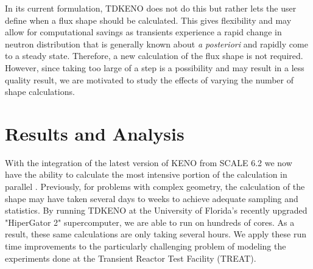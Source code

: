 \documentclass{anstrans}
\renewcommand{\vec}[1]{\bm{#1}} %
\newcommand{\vd}{\bm{\cdot}} %
\newcommand{\grad}{\vec{\nabla}} %
\newcommand{\ud}{\mathop{}\!\mathrm{d}} %
\begin{document}

 In its current formulation, TDKENO does not do this but rather lets the user define when a flux shape should be calculated.  This gives flexibility and may allow for computational savings as transients experience a rapid change in neutron distribution that is generally known about \emph{a posteriori} and rapidly come to a steady state. Therefore, a new calculation of the flux shape is not required. However, since taking too large of a step is a possibility and may result in a less quality result, we are motivated to study the effects of varying the number of shape calculations.


\section{Results and Analysis}
With the integration of the latest version of KENO from SCALE 6.2 we now have the ability to calculate the most intensive portion of the calculation in parallel \cite{rearden2013overview}.  Previously, for problems with complex geometry, the calculation of the shape may have taken several days to weeks to achieve adequate sampling and statistics.  By running TDKENO at the University of Florida's recently upgraded "HiperGator 2" supercomputer, we are able to run on hundreds of cores. As a result, these same calculations are only taking several hours. We apply these run time improvements to the particularly challenging problem of modeling the experiments done at the Transient Reactor Test Facility (TREAT). 
\end{document}

